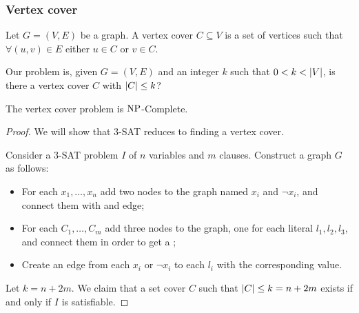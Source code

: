 \documentclass[12pt]{extarticle}
\newcommand{\NP}{{\operatorfont NP}}
\newcommand{\NPC}{$\NP$-Complete}
\begin{document}
\subsubsection{Vertex cover}

\begin{definition}
    Let $G = (V,E)$ be a graph. A vertex cover $C \subseteq V$ is a set of vertices such that $\forall (u, v) \in E$ either $u \in C$ or $v \in C$.
\end{definition}

\begin{definition}
    Our problem is, given $G=(V, E)$ and an integer $k$ such that $0 < k < \abs{V}$, is there a vertex cover $C$ with $\abs{C} \leq k$?
\end{definition}

\begin{theorem}
    The vertex cover problem is \NPC.
\end{theorem}

\begin{proof}
    We will show that 3-SAT reduces to finding a vertex cover.

    Consider a 3-SAT problem $I$ of $n$ variables and $m$ clauses.
    Construct a graph $G$ as follows:
    \begin{itemize}
        \item For each $x_1, \ldots, x_n$ add two nodes to the graph named $x_i$ and $\lnot x_i$, and connect them with and edge;
        \item For each $C_1, \ldots, C_m$ add three nodes to the graph, one for each literal $l_1, l_2, l_3$, and connect them in order to get a ;
        \item Create an edge from each $x_i$ or $\lnot x_i$ to each $l_i$ with the corresponding value.
    \end{itemize}


    Let $k = n + 2m$. We claim that a set cover $C$ such that $\abs{C} \leq k = n +2m$ exists if and only if $I$ is satisfiable.
\end{proof}
\end{document}
